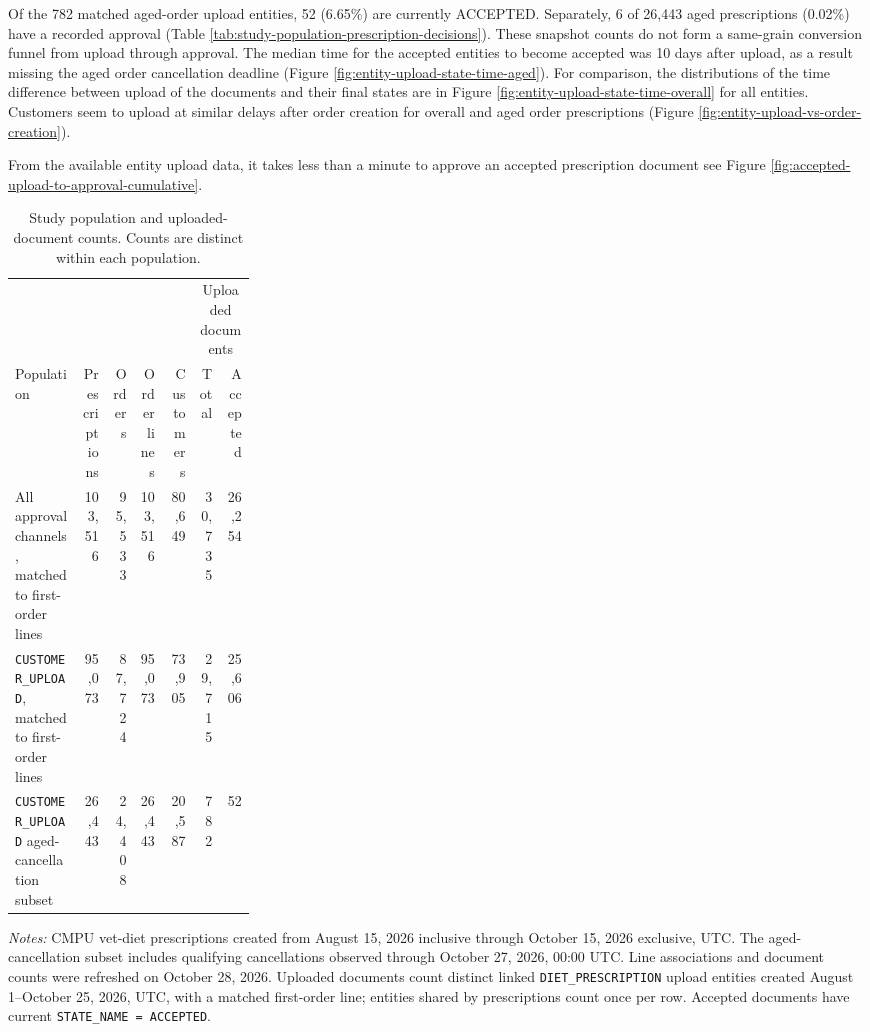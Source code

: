 Of the 782 matched aged-order upload entities, 52 (6.65\%) are currently
ACCEPTED. Separately, 6 of 26,443 aged prescriptions (0.02\%) have a
recorded approval (Table \ref{tab:study-population-prescription-decisions}).
These snapshot counts do not form a same-grain conversion funnel from
upload through approval. The median time for the accepted entities
to become accepted was 10 days after upload, as a result
missing the aged order cancellation deadline (Figure
\ref{fig:entity-upload-state-time-aged}).  For comparison, the
distributions of the time difference between upload of the documents
and their final states are in Figure
\ref{fig:entity-upload-state-time-overall} for all entities.
Customers seem to upload at similar delays after order creation for
overall and aged order prescriptions (Figure
\ref{fig:entity-upload-vs-order-creation}).

From the available entity upload data, it takes less than a minute to
approve an accepted prescription document see Figure
\ref{fig:accepted-upload-to-approval-cumulative}.

\begin{table}[htbp]
\centering
\caption{Study population and uploaded-document counts. Counts are distinct within each population.}
\label{tab:study-population-counts}
\small
\begin{tabular}{@{}>{\raggedright\arraybackslash}p{0.28\linewidth}rrrrrr@{}}
\toprule
& & & & & \multicolumn{2}{c}{Uploaded documents} \\
\cmidrule(lr){6-7}
Population & Prescriptions & Orders & \shortstack[r]{Order\\lines} & Customers & Total & Accepted \\
\midrule
All approval channels, matched to first-order lines & 103,516 & 95,533 & 103,516 & 80,649 & 30,735 & 26,254 \\
\texttt{CUSTOMER\_UPLOAD}, matched to first-order lines & 95,073 & 87,724 & 95,073 & 73,905 & 29,715 & 25,606 \\
\texttt{CUSTOMER\_UPLOAD} aged-cancellation subset & 26,443 & 24,408 & 26,443 & 20,587 & 782 & 52 \\
\bottomrule
\end{tabular}

\begin{minipage}{\linewidth}
\footnotesize
\textit{Notes:} CMPU vet-diet prescriptions created from August 15, 2026 inclusive
through October 15, 2026 exclusive, UTC. The aged-cancellation subset includes
qualifying cancellations observed through October 27, 2026, 00:00 UTC.
Line associations and document counts were refreshed on October 28, 2026.
Uploaded documents count distinct linked \texttt{DIET\_PRESCRIPTION} upload entities
created August 1--October 25, 2026, UTC, with a matched first-order line; entities
shared by prescriptions count once per row. Accepted documents have current
\texttt{STATE\_NAME = ACCEPTED}.
\end{minipage}
\end{table}


